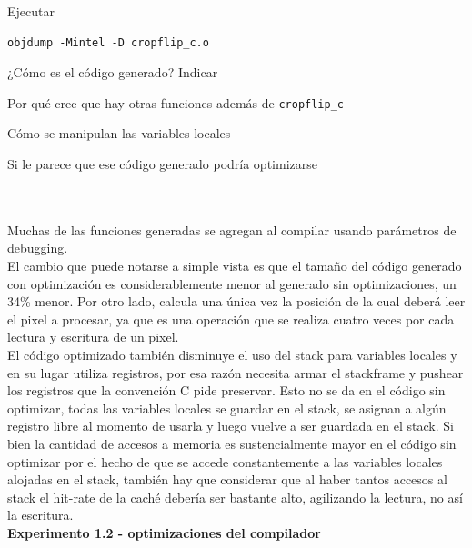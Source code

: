 Ejecutar 
\begin{codesnippet}
\begin{verbatim}
objdump -Mintel -D cropflip_c.o
\end{verbatim}
\end{codesnippet}

¿Cómo es el código generado? 
Indicar
\begin{inparaenum}
    \item Por qué cree que hay otras funciones además de \verb|cropflip_c|
    \item Cómo se manipulan las variables locales
    \item Si le parece que ese código generado podría optimizarse
\end{inparaenum}\\
\\
\indent Muchas de las funciones generadas se agregan al compilar usando parámetros de debugging.\\ 
\indent El cambio que puede notarse a simple vista es que el tamaño del código generado con optimización es considerablemente menor al generado sin optimizaciones, un 34\% menor. Por otro lado, calcula una única vez la posición de la cual deberá leer el pixel a procesar, ya que es una operación que se realiza cuatro veces por cada lectura y escritura de un pixel. \\
\indent El c\'odigo optimizado también disminuye el uso del stack para variables locales y en su lugar utiliza registros, por esa razón necesita armar el stackframe y pushear los registros que la convención C pide preservar. Esto no se da en el c\'odigo sin optimizar, todas las variables locales se guardar en el stack, se asignan a algún registro libre al momento de usarla y luego vuelve a ser guardada en el stack. Si bien la cantidad de accesos a memoria es sustencialmente mayor en el c\'odigo sin optimizar por el hecho de que se accede constantemente a las variables locales alojadas en el stack, también hay que considerar que al haber tantos accesos al stack el hit-rate de la caché debería ser bastante alto, agilizando la lectura, no así la escritura. \\

\vspace*{0.3cm} \noindent
\textbf{Experimento 1.2 - optimizaciones del compilador}

